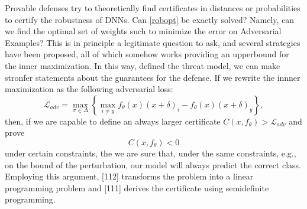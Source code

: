 \documentclass[LaM,binding=0.6cm]{./packages/sapthesis/sapthesis}
\begin{document}
            Provable defenses try to theoretically find certificates in distances or probabilities to certify the robustness of DNNs.
            Can \ref{robopt} be exactly solved? Namely, can we find the optimal set of weights such to minimize 
            the error on Adversarial Examples? This is in principle a legitimate question to ask, and several 
            strategies have been proposed, all of which somehow works providing an upperbound for the inner maximization.
            In this way, defined the threat model, we can make stronfer statements about the guarantees for the defense.
            If we rewrite the innner maximization as the following adversarial loss:
            \begin{equation}
                \mathcal{L}_{a d v}=\max _{\sigma \in \Delta}\left\{\max _{i \neq y} f_{\theta}(x)\left(x + \delta\right)_{i}-f_{\theta}(x)\left(x + \delta\right)_{y}\right\},
            \end{equation}
            then, if we are capable to define an always larger certificate $ C(x, f_{\theta}) > \mathcal{L}_{a d v}$ and prove
            \begin{equation}
                C(x, f_{\theta}) < 0
            \end{equation}
            under certain constraints, the we are sure that, under the same constraints, e.g., on the bound of 
            the perturbation, our model will always predict the correct class. Employing this argument,
            [112] transforms the problem into a linear programming problem and [111] derives the certificate using
            semidefinite programming.
            
\end{document}
